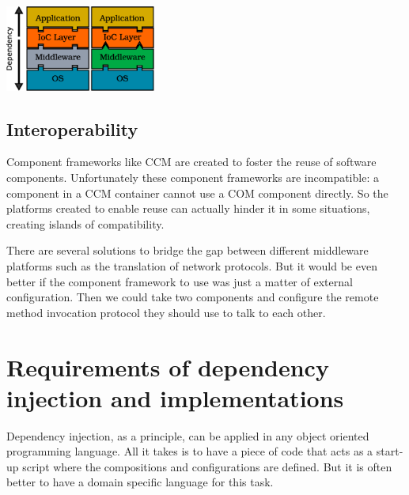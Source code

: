 \begin{center}
\includegraphics[height=80pt]{graphics_tables/good_layers.eps} 
\end{center}


\subsection{Interoperability}

Component frameworks like CCM are created to foster the reuse of software components. Unfortunately these component frameworks are
incompatible: a component in a CCM container cannot use a COM component directly. So the platforms created to enable reuse can actually
hinder it in some situations, creating islands of compatibility. 

There are several solutions to bridge the gap between different middleware platforms such as the translation of network protocols.
But it would be even better if the component framework to use was just a matter of external configuration. Then we could take two
components and configure the remote method invocation protocol they should use to talk to each other.

\section{Requirements of dependency injection and implementations}

Dependency injection, as a principle, can be applied in any object oriented programming language. All it takes is to have
a piece of code that acts as a start-up script where the compositions and configurations are defined. But it is often better
to have a domain specific language for this task.

